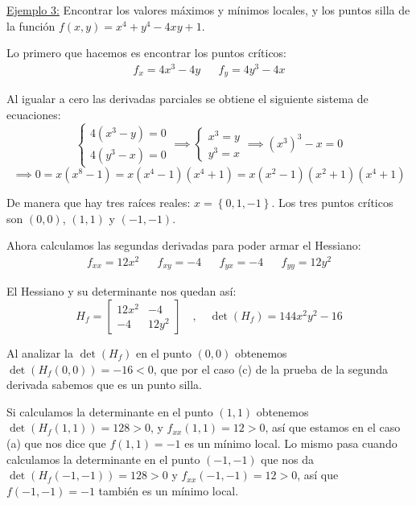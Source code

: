 \documentclass[12pt]{article}
\begin{document}
\underline{Ejemplo 3:} Encontrar los valores máximos y mínimos locales, y los puntos silla de la función $ f(x,y)=x^4+y^4-4xy+1 $.

Lo primero que hacemos es encontrar los puntos críticos:
\begin{align*}
  f_{x} = 4x^3-4y && f_{y}=4y^3-4x
\end{align*}

Al igualar a cero las derivadas parciales se obtiene el siguiente sistema de ecuaciones:
\[
\begin{cases}
  4(x^3-y) = 0\\
  4(y^3-x) = 0
\end{cases} \implies \begin{cases}
  x^3=y\\
  y^3=x 
\end{cases} \implies (x^3)^3 - x = 0  
\]
\[
  \implies 0=x(x^8-1)=x(x^4-1)(x^4+1)=x(x^2-1)(x^2+1)(x^4+1)
\]

De manera que hay tres raíces reales: $ x=\left\{0,1,-1\right\} $. Los tres puntos críticos son $ (0,0) $, $ (1,1) $ y $ (-1,-1) $.

Ahora calculamos las segundas derivadas para poder armar el Hessiano:
\begin{align*}
  f_{xx} = 12x^2 && f_{xy} = -4 && f_{yx} = -4 && f_{yy} = 12y^2
\end{align*}

El Hessiano y su determinante nos quedan así:
\[H_{f}=
  \begin{bmatrix}
	  12x^2 & -4 \\
	  -4 & 12y^2
  \end{bmatrix} \quad  , \quad 
 \det(H_{f}) = 144x^2y^2-16 
\]

Al analizar la $ \det(H_{f}) $ en el punto $ (0,0) $ obtenemos $ \det(H_{f}(0,0))=-16 < 0 $, que por el caso (c) de la prueba de la segunda derivada sabemos que es un punto silla.

Si calculamos la determinante en el punto $ (1,1) $ obtenemos $ \det(H_{f}(1,1))=128>0 $, y $ f_{xx}(1,1)=12>0 $, así que estamos en el caso (a) que nos dice que $ f(1,1)=-1 $ es un mínimo local. Lo mismo pasa cuando calculamos la determinante en el punto $ (-1,-1) $ que nos da $ \det(H_{f}(-1,-1))=128>0 $ y $ f_{xx}(-1,-1)=12>0 $, así que $ f(-1,-1)=-1 $ también es un mínimo local.
\end{document}
